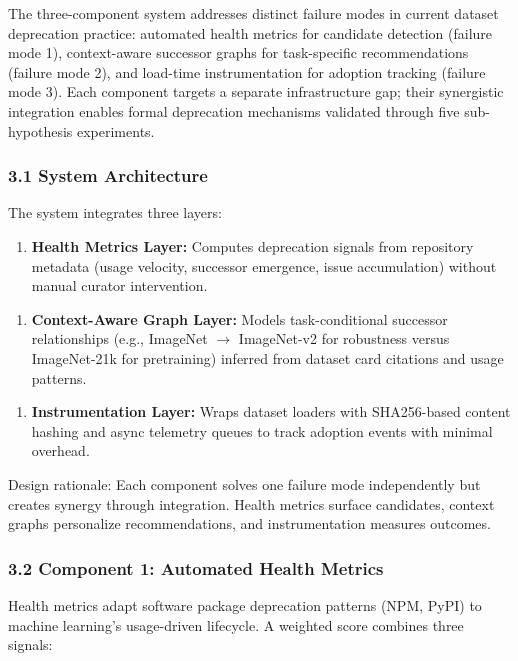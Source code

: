 
The three-component system addresses distinct failure modes in current dataset deprecation practice: automated health metrics for candidate detection (failure mode 1), context-aware successor graphs for task-specific recommendations (failure mode 2), and load-time instrumentation for adoption tracking (failure mode 3). Each component targets a separate infrastructure gap; their synergistic integration enables formal deprecation mechanisms validated through five sub-hypothesis experiments.

\subsubsection{3.1 System Architecture}

The system integrates three layers:

\begin{enumerate}
\item \textbf{Health Metrics Layer:} Computes deprecation signals from repository metadata (usage velocity, successor emergence, issue accumulation) without manual curator intervention.
\end{enumerate}

\begin{enumerate}
\item \textbf{Context-Aware Graph Layer:} Models task-conditional successor relationships (e.g., ImageNet $\rightarrow$ ImageNet-v2 for robustness versus ImageNet-21k for pretraining) inferred from dataset card citations and usage patterns.
\end{enumerate}

\begin{enumerate}
\item \textbf{Instrumentation Layer:} Wraps dataset loaders with SHA256-based content hashing and async telemetry queues to track adoption events with minimal overhead.
\end{enumerate}

Design rationale: Each component solves one failure mode independently but creates synergy through integration. Health metrics surface candidates, context graphs personalize recommendations, and instrumentation measures outcomes.

\subsubsection{3.2 Component 1: Automated Health Metrics}

Health metrics adapt software package deprecation patterns (NPM, PyPI) to machine learning's usage-driven lifecycle. A weighted score combines three signals:

